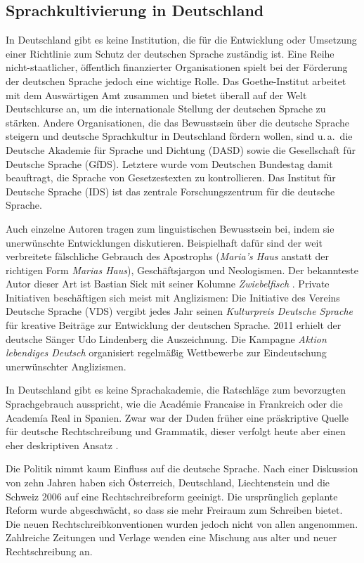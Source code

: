 \documentclass[]{../../metanetpaper}
\begin{document}
\begin{multicols}{2}
\subsection{Sprachkultivierung in Deutschland}

In Deutschland gibt es keine Institution, die für die Entwicklung oder Umsetzung einer Richtlinie zum Schutz der deutschen Sprache zuständig ist. Eine Reihe nicht-staat\-licher, öffentlich finanzierter Organisationen spielt bei der Förderung der deutschen Sprache jedoch eine wichtige Rolle. Das Goethe-In\-sti\-tut arbeitet mit dem Auswärtigen Amt zusammen und bietet überall auf der Welt Deutschkurse an, um die internationale Stellung der deutschen Sprache zu stärken. Andere Organisationen, die das Bewusstsein über die deutsche Sprache steigern und deutsche Sprachkultur in Deutschland fördern wollen, sind u.\,a.~die Deutsche Akademie für Sprache und Dichtung (DASD) sowie die Gesellschaft für Deutsche Sprache (GfDS). Letztere wurde vom Deutschen Bundestag damit beauftragt, die Sprache von Gesetzestexten zu kontrollieren. Das Institut für Deutsche Sprache (IDS) ist das zentrale Forschungszentrum für die deutsche Sprache. 

Auch einzelne Autoren tragen zum linguistischen Bewusstsein bei, indem sie unerwünschte Entwicklungen diskutieren. Beispielhaft dafür sind der weit verbreitete fälschliche Gebrauch des Apostrophs (\textit{Maria’s Haus} anstatt der richtigen Form \textit{Marias Haus}), Geschäftsjargon und Neologismen. Der bekannteste Autor dieser Art ist Bastian Sick \cite{Sick1} mit seiner Kolumne \textit{Zwiebelfisch} \cite{Sick2}. Private Initiativen beschäftigen sich meist mit Anglizismen: Die Initiative des Vereins Deutsche Sprache (VDS) vergibt jedes Jahr seinen \textit{Kulturpreis Deutsche Sprache} für kreative Beiträge zur Entwicklung der deutschen Sprache. 2011 erhielt der deutsche Sänger Udo Lindenberg die Auszeichnung. Die Kampagne \textit{Aktion lebendiges Deutsch} organisiert regelmäßig Wettbewerbe zur Eindeutschung unerwünschter Anglizismen. 

In Deutschland gibt es keine Sprachakademie, die Ratschläge zum bevorzugten Sprachgebrauch ausspricht, wie die Académie Francaise in Frankreich oder die Academía Real in Spanien. Zwar war der Duden früher eine präskriptive Quelle für deutsche Rechtschreibung und Grammatik, dieser verfolgt heute aber einen eher deskriptiven Ansatz \cite{Schn1}. 

Die Politik nimmt kaum Einfluss auf die deutsche Sprache. Nach einer Diskussion von zehn Jahren haben sich Österreich, Deutschland, Liechtenstein und die Schweiz 2006 auf eine Rechtschreibreform geeinigt. Die ursprünglich geplante Reform wurde abgeschwächt, so dass sie mehr Freiraum zum Schreiben bietet. Die neuen Rechtschreibkonventionen wurden jedoch nicht von allen angenommen. Zahlreiche Zeitungen und Verlage wenden eine Mischung aus alter und neuer Rechtschreibung an.


\end{multicols}
\end{document}
